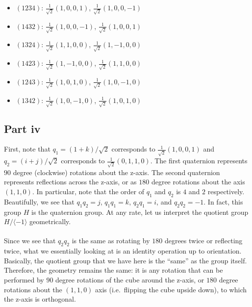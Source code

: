 \documentclass[letterpaper]{article}
\begin{document}
\begin{itemize}
    \item $ (1234) $: $ \frac{1}{\sqrt{2}} (1, 0, 0, 1) $, $ \frac{1}{\sqrt{2}} (1, 0, 0, -1) $
    \item $ (1432) $: $ \frac{1}{\sqrt{2}} (1, 0, 0, -1) $, $ \frac{1}{\sqrt{2}} (1, 0, 0, 1) $

    \item $ (1324) $: $ \frac{1}{\sqrt{2}} (1, 1, 0, 0) $, $ \frac{1}{\sqrt{2}} (1, -1, 0, 0) $
    \item $ (1423) $: $ \frac{1}{\sqrt{2}} (1, -1, 0, 0) $, $ \frac{1}{\sqrt{2}} (1, 1, 0, 0) $

    \item $ (1243) $: $ \frac{1}{\sqrt{2}} (1, 0, 1, 0) $, $ \frac{1}{\sqrt{2}} (1, 0, -1, 0) $
    \item $ (1342) $: $ \frac{1}{\sqrt{2}} (1, 0, -1, 0) $, $ \frac{1}{\sqrt{2}} (1, 0, 1, 0) $
\end{itemize}



\subsection{Part iv}
\label{subs:1Partiv}

First, note that $ q_1 = (1 + k) / \sqrt{2} $ corresponds to $ \frac{1}{\sqrt{2}} (1, 0, 0, 1) $ and $ q_2 = (i + j) / \sqrt{2} $ corresponds to $ \frac{1}{\sqrt{2}} (0, 1, 1, 0) $.
The first quaternion represents $ 90 $ degree (clockwise) rotations about the z-axis.
The second quaternion represents reflections across the z-axis, or as $ 180 $ degree rotations about the axis $ (1, 1, 0) $.
In particular, note that the order of $ q_1 $ and $ q_2 $ is $ 4 $ and $ 2 $ respectively.
Beautifully, we see that $ q_1 q_2 = j $, $ q_1 q_1 = k $, $ q_2 q_1 = i $, and $ q_2 q_2 = -1 $.
In fact, this group $ H $ is the quaternion group.
At any rate, let us interpret the quotient group $ H / \langle -1 \rangle $ geometrically.
\\ \\
Since we see that $ q_2 q_2 $ is the same as rotating by $ 180 $ degrees twice or reflecting twice, what we essentially looking at is an identity operation up to orientation.
Basically, the quotient group that we have here is the ``same'' as the group itself.
Therefore, the geometry remains the same: it is any rotation that can be performed by $ 90 $ degree rotations of the cube around the z-axis, or $ 180 $ degree rotations about the $ (1, 1, 0) $ axis (i.e.\ flipping the cube upside down), to which the z-axis is orthogonal.
\end{document}

